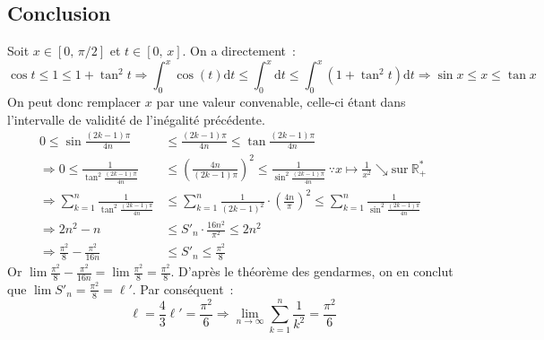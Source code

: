 \documentclass{article}
\begin{document}
  \subsection{Conclusion}
  Soit $x\in[0,\, \pi/2]$ et $t \in[0,\, x]$. On a directement~:
  \[
  \cos t \leqslant 1 \leqslant 1 + \tan^2 t \Longrightarrow
  \int_0^x \cos(t)\mathrm dt \leqslant \int_0^x \mathrm dt \leqslant \int_0^x (1 + \tan^2 t)\mathrm dt
  \Longrightarrow \sin x \leqslant x \leqslant \tan x
  \]
  On peut donc remplacer $x$ par une valeur convenable, celle-ci étant dans l'intervalle de validité de l'inégalité précédente.
  \begin{align*}
    0 \leqslant \sin \frac{(2k - 1)\pi}{4n} &\leqslant \frac{(2k - 1)\pi}{4n} \leqslant \tan \frac{(2k - 1)\pi}{4n} \\
    \Longrightarrow 0 \leqslant \frac{1}{\tan^2 \frac{(2k - 1)\pi}{4n}} &\leqslant \left(\frac{4n}{(2k - 1)\pi}\right)^2 \leqslant \frac{1}{\sin^2 \frac{(2k - 1)\pi}{4n}}\ \because x\mapsto \frac{1}{x^2}\searrow \text{sur}\ \mathbb{R}^*_+ \\
    \Longrightarrow \sum_{k=1}^n \frac{1}{\tan^2 \frac{(2k - 1)\pi}{4n}} &\leqslant \sum_{k=1}^n \frac{1}{(2k - 1)^2}\cdot \left(\frac{4n}{\pi}\right)^2 \leqslant \sum_{k=1}^n \frac{1}{\sin^2 \frac{(2k - 1)\pi}{4n}} \\
    \Longrightarrow 2n^2 - n &\leqslant S'_n \cdot \frac{16n^2}{\pi^2} \leqslant 2n^2 \\
    \Longrightarrow \frac{\pi^2}{8} - \frac{\pi^2}{16n} &\leqslant S'_n \leqslant \frac{\pi^2}{8}
  \end{align*}
  Or $\lim \frac{\pi^2}{8} - \frac{\pi^2}{16n} = \lim \frac{\pi^2}{8} = \frac{\pi^2}{8}$. D'après le théorème des gendarmes, on en conclut que $\lim S'_n = \frac{\pi^2}{8} = \ell'$. Par conséquent~:
  \[
  \ell = \frac{4}{3}\ell' = \frac{\pi^2}{6} \Longrightarrow \boxed{\lim_{n\to\infty} \sum_{k=1}^n \frac{1}{k^2} = \frac{\pi^2}{6}}
  \]
\end{document}
